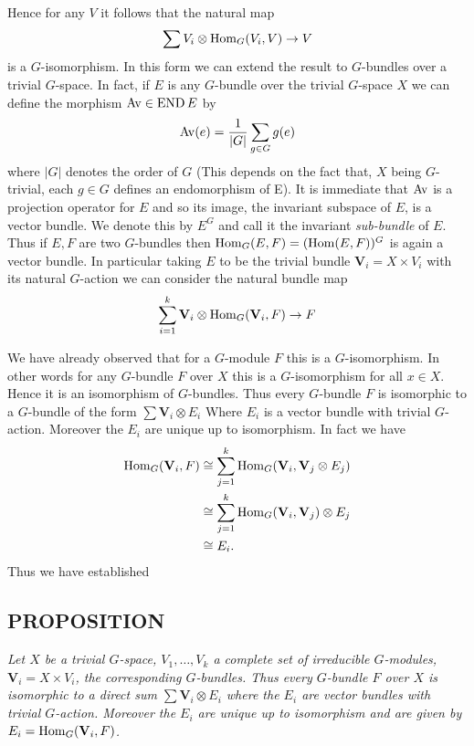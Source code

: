 Hence for any $V$ it follows that the natural map
\begin{equation*}
    \sum V_i \otimes \operatorname{Hom}_G(V_i, V) \to V
\end{equation*}
is a $G$-isomorphism. In this form we can extend the result to $G$-bundles over a trivial $G$-space. In fact, if $E$ is any $G$-bundle over the trivial $G$-space $X$ we can define the morphism $\operatorname{Av} \in \operatorname{END} E$ by
\begin{equation*}
    \operatorname{Av}(e) = \frac{1}{|G|} \sum_{g \in G} g(e)
\end{equation*}
where $|G|$ denotes the order of $G$ (This depends on the fact that, $X$ being $G$-trivial, each $g \in G$ defines an endomorphism of E). It is immediate that $\operatorname{Av}$ is a projection operator for $E$ and so its image, the invariant subspace of $E$, is a vector bundle. We denote this by $E^G$ and call it the invariant \textit{sub-bundle} of $E$. Thus if $E, F$ are two $G$-bundles then $\operatorname{Hom}_G(E, F) = (\operatorname{Hom}(E, F))^G$ is again a vector bundle. In particular taking $E$ to be the trivial bundle $\textbf{V}_i = X \times V_i$ with its natural $G$-action we can consider the natural bundle map
\begin{equation*}
    \sum_{i=1}^k \textbf{V}_i \otimes \operatorname{Hom}_G(\textbf{V}_i, F) \to F
\end{equation*} \par 

We have already observed that for a $G$-module $F$ this is a $G$-isomorphism. In other words for any $G$-bundle $F$ over $X$ this is a $G$-isomorphism for all $x \in X$. Hence it is an isomorphism of $G$-bundles. Thus every $G$-bundle $F$ is isomorphic to a $G$-bundle of the form $\sum \textbf{V}_i \otimes E_i$ Where $E_i$ is a vector bundle with trivial $G$-action. Moreover the $E_i$ are unique up to isomorphism. In fact we have
\begin{align*}
    \operatorname{Hom}_G(\textbf{V}_i, F) & \cong \sum_{j=1}^k  \operatorname{Hom}_G(\textbf{V}_i, \textbf{V}_j \otimes E_j) \\
    & \cong \sum_{j=1}^k  \operatorname{Hom}_G(\textbf{V}_i, \textbf{V}_j) \otimes E_j \\
    & \cong E_i.
\end{align*}
Thus we have established

\subsection{PROPOSITION}\label{prop:1.6.2} \textit{Let $X$ be a trivial $G$-space, $V_1, \ldots, V_k$ a complete set of irreducible $G$-modules, $\textbf{V}_i = X \times V_i$, the corresponding $G$-bundles. Thus every $G$-bundle $F$ over $X$ is isomorphic to a direct sum $\sum \textbf{V}_i \otimes E_i$ where the $E_i$ are vector bundles with trivial $G$-action. Moreover the $E_i$ are unique up to isomorphism and are given by $E_i = \operatorname{Hom}_G(\textbf{V}_i, F)$.} \par 

